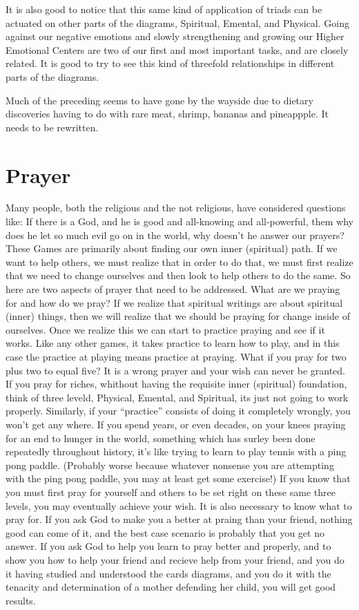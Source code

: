 \documentclass[12pt,letterpaper]{book}
\begin{document}
It is also good to notice that this same kind of application of triads can be actuated on other parts of the diagrams, Spiritual, Emental, and Physical. Going against our negative emotions and slowly strengthening and growing our Higher Emotional Centers are two of our first and most important tasks, and are closely related. It is good to try to see this kind of threefold relationships in different parts of the diagrams.

Much of the preceding seems to have gone by the wayside due to dietary discoveries having to do with rare meat, shrimp, bananas and pineappple. It needs to be rewritten. 

\chapter{Prayer}

Many people, both the religious and the not religious, have considered questions like: If there is a God, and he is good and all-knowing and all-powerful, them why does he let so much evil go on in the world, why doesn't he answer our prayers? These Games are primarily about finding our own inner (spiritual) path. If we want to help others, we must realize that in order to do that, we must first realize that we need to change ourselves and then look to help others to do the same. So here are two aspects of prayer that need to be addressed. What are we praying for and how do we pray? If we realize that spiritual writings are about spiritual (inner) things, then we will realize that we should be praying for change inside of ourselves. Once we realize this we can start to practice praying and see if it works. Like any other games, it takes practice to learn how to play, and in this case the practice at playing means practice at praying. What if you pray for two plus two to equal five? It is a wrong prayer and your wish can never be granted. If you pray for riches, whithout having the requisite inner (spiritual) foundation, think of three leveld, Physical, Emental, and Spiritual, its just not going to work properly. Similarly, if your ``practice'' consists of doing it completely wrongly, you won't get any where. If you spend years, or even decades, on your knees praying for an end to hunger in the world, something which has surley been done repeatedly throughout history, it's like trying to learn to play tennis with a ping pong paddle. (Probably worse because whatever nonsense you are attempting with the ping pong paddle, you may at least get some exercise!) If you know that you must first pray for yourself and others to be set right on these same three levels, you may eventually achieve your wish. It is also necessary to know what to pray for. If you ask God to make you a better at praing than your friend, nothing good can come of it, and the best case scenario is probably that you get no answer. If you ask God to help you learn to pray better and properly, and to show you how to help your friend and recieve help from your friend, and you do it having studied and understood the cards diagrams, and you do it with the tenacity and determination of a mother defending her child, you will get good results.
\end{document}

